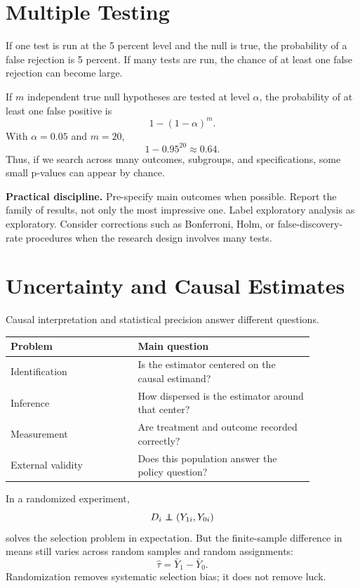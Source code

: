 \section{Multiple Testing}

If one test is run at the 5 percent level and the null is true, the probability
of a false rejection is 5 percent. If many tests are run, the chance of at
least one false rejection can become large.

If $m$ independent true null hypotheses are tested at level $\alpha$, the
probability of at least one false positive is
\[
  1-(1-\alpha)^m.
\]
With $\alpha=0.05$ and $m=20$,
\[
  1-0.95^{20}\approx 0.64.
\]
Thus, if we search across many outcomes, subgroups, and specifications, some
small p-values can appear by chance.

\begin{boxD}
\textbf{Practical discipline.} Pre-specify main outcomes when possible. Report
the family of results, not only the most impressive one. Label exploratory
analysis as exploratory. Consider corrections such as Bonferroni, Holm, or
false-discovery-rate procedures when the research design involves many tests.
\end{boxD}

\section{Uncertainty and Causal Estimates}

Causal interpretation and statistical precision answer different questions.

\begin{center}
\begin{tabular}{p{0.36\linewidth}p{0.50\linewidth}}
\toprule
Problem & Main question \\
\midrule
Identification & Is the estimator centered on the causal estimand? \\
Inference & How dispersed is the estimator around that center? \\
Measurement & Are treatment and outcome recorded correctly? \\
External validity & Does this population answer the policy question? \\
\bottomrule
\end{tabular}
\end{center}

In a randomized experiment,
\[
  D_i \independent (Y_{1i},Y_{0i})
\]
solves the selection problem in expectation. But the finite-sample difference
in means still varies across random samples and random assignments:
\[
  \hat{\tau}=\bar{Y}_1-\bar{Y}_0.
\]
Randomization removes systematic selection bias; it does not remove luck.

